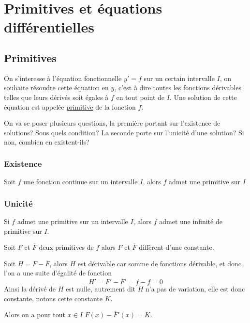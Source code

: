\documentclass[french]{book}
\begin{document}
\chapter{Primitives et équations différentielles}
\section{Primitives}

\begin{defn}
On s'interesse à l'équation fonctionnelle $y'=f$ sur un certain intervalle $I$, on souhaite résoudre cette équation en $y$, c'est à dire toutes les fonctions dérivables telles que leurs dérivés soit égales à $f$ en tout point de $I$. Une solution de cette équation est appelée \underline{primitive} de la fonction $f$.
\end{defn}

On va se poser plusieurs questions, la première portant sur l'existence de solutions? Sous quels condition? La seconde porte sur l'unicité d'une solution? Si non, combien en existent-ils?

\subsection{Existence}
\begin{thm}[admis]
Soit $f$ une fonction continue sur un intervalle $I$, alors $f$ admet une primitive sur $I$
\end{thm}

\subsection{Unicité}

\begin{thm}
Si $f$ admet une primitive sur un intervalle $I$, alors $f$ admet une infinité de primitive sur $I$.
\end{thm}

\begin{thm}
Soit $F$ et $\overline{F}$ deux primitives de $f$ alors $F$ et  $\overline{F}$  diffèrent d'une constante.
\end{thm}

\begin{demo}
Soit $H=F-\overline{F}$, alors $H$ est dérivable car somme de fonctions dérivable, et donc l'on a une suite d'égalité de fonction
$$H'=F'-\overline{F}'=f-f=0$$  
Ainsi la dérivé de $H$ est nulle, autrement dit $H$ n'a pas de variation, elle est donc constante, notons cette constante $K$.

Alors on a pour tout $x\in I$ $F(x)-\overline{F}'(x)=K$. 
\end{demo}
\end{document}
